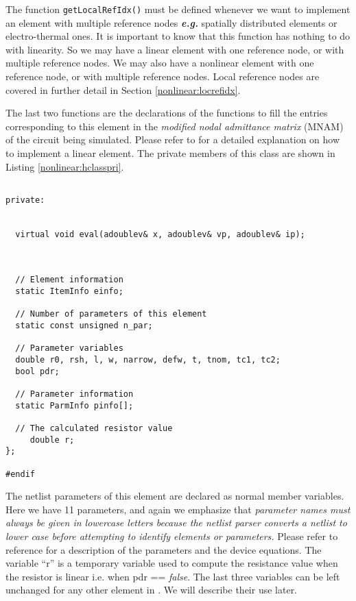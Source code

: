 The function \texttt{getLocalRefIdx()} must be defined whenever we
want to implement an element with multiple reference nodes
\textbf{\textit{e.g.}} spatially distributed elements or
electro-thermal ones. It is important to know that this function
has nothing to do with linearity. So we may have a linear element
with one reference node, or with multiple reference nodes. We may
also have a nonlinear element with one reference node, or with
multiple reference nodes.  Local reference nodes are covered in
further detail in Section \ref{nonlinear:locrefidx}.

The last two functions are the declarations of the functions
to fill the entries corresponding to this element in the
\emph{modified nodal admittance matrix} (MNAM) of the circuit
being simulated. Please refer to
\cite{l_element} for a detailed
explanation on how to implement a linear element.
\newline
\newline
The private members of this class are shown in Listing
\ref{nonlinear:hclasspri}.

\begin{lstlisting}[firstnumber=last, label={nonlinear:hclasspri},
    caption={Private functions of Tresistor.h}]

private:


  virtual void eval(adoublev& x, adoublev& vp, adoublev& ip);



  // Element information
  static ItemInfo einfo;

  // Number of parameters of this element
  static const unsigned n_par;

  // Parameter variables
  double r0, rsh, l, w, narrow, defw, t, tnom, tc1, tc2;
  bool pdr;

  // Parameter information
  static ParmInfo pinfo[];

  // The calculated resistor value
     double r;
};

#endif
\end{lstlisting}

The netlist parameters of this element are declared as normal
member variables. Here we have 11 parameters, and again we
emphasize that \emph{parameter names must always be given in
lowercase letters because the \FDA netlist parser converts a netlist
to lower case before attempting to identify elements or parameters.}
Please refer to reference \cite{etrcat} for a description of the
parameters and the device equations. The variable ``r'' is a temporary
variable used to compute the resistance value when the resistor is linear
i.e. when pdr == \emph{false}. The last three variables can be left
unchanged for any other element in \FDA. We will describe their use later.

